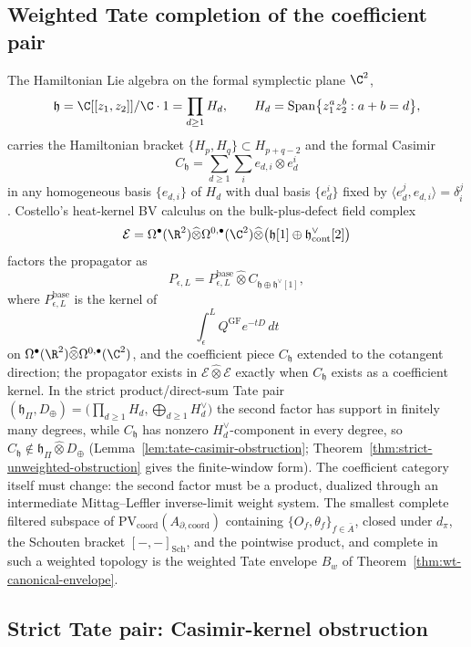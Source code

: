 \subsection*{Weighted Tate completion of the coefficient pair}

The Hamiltonian Lie algebra on the formal symplectic plane $\C^2$,
\[
  \mathfrak h=\C[[z_1,z_2]]/\C\cdot 1=\prod_{d\geq1}H_d,\qquad
  H_d=\mathrm{Span}\bigl\{z_1^az_2^b:a+b=d\bigr\},
\]
carries the Hamiltonian bracket $\{H_p,H_q\}\subset H_{p+q-2}$ and the
formal Casimir
\[
  C_{\mathfrak h}=\sum_{d\geq1}\sum_i e_{d,i}\otimes e^i_d
\]
in any homogeneous basis $\{e_{d,i}\}$ of $H_d$ with dual basis
$\{e^i_d\}$ fixed by $\langle e^j_d,e_{d,i}\rangle=\delta^j_i$.
Costello's heat-kernel BV calculus on the bulk-plus-defect field complex
\[
  \mathcal E=\Omega^\bullet(\R^2)\widehat\otimes
  \Omega^{0,\bullet}(\C^2)\widehat\otimes
  \bigl(\mathfrak h[1]
        \oplus\mathfrak h^\vee_{\mathrm{cont}}[2]\bigr)
\]
factors the propagator as
\[
  P_{\epsilon,L}=P_{\epsilon,L}^{\mathrm{base}}\widehat\otimes
  C_{\mathfrak h\oplus\mathfrak h^\vee[1]},
\]
where \(P_{\epsilon,L}^{\mathrm{base}}\) is the kernel of
\[
  \int_\epsilon^L Q^{\mathrm{GF}}e^{-tD}\,dt
\]
on
\(\Omega^\bullet(\R^2)\widehat\otimes
\Omega^{0,\bullet}(\C^2)\), and the
coefficient piece $C_{\mathfrak h}$ extended to the cotangent direction;
the propagator exists in $\mathcal E\widehat\otimes\mathcal E$ exactly
when $C_{\mathfrak h}$ exists as a coefficient kernel.  In the strict
product/direct-sum Tate pair
\(
  (\mathfrak h_\Pi,D_\oplus)
  =\bigl(\prod_{d\geq1}H_d,\bigoplus_{d\geq1}H_d^\vee\bigr)
\)
the second factor has support in finitely many degrees, while
$C_{\mathfrak h}$ has nonzero $H_d^\vee$-component in every degree, so
\(
  C_{\mathfrak h}\notin\mathfrak h_\Pi\widehat\otimes D_\oplus
\)
(Lemma~\ref{lem:tate-casimir-obstruction};
	Theorem~\ref{thm:strict-unweighted-obstruction} gives the
	finite-window form).  The coefficient category itself must change: the
second factor must be a product, dualized through an intermediate
Mittag--Leffler inverse-limit weight system.  The smallest complete
filtered subspace of
$\mathrm{PV}_{\mathrm{coord}}(A_{\partial,\mathrm{coord}})$ containing
$\{O_f,\theta_f\}_{f\in\bar A}$, closed under $d_\pi$, the Schouten
bracket $[-,-]_{\mathrm{Sch}}$, and the pointwise product, and complete
in such a weighted topology is the weighted Tate envelope $B_w$ of
Theorem~\ref{thm:wt-canonical-envelope}.

\subsection*{Strict Tate pair: Casimir-kernel obstruction}

